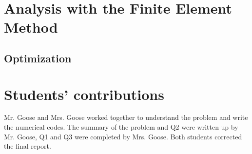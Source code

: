 \documentclass[12pt]{article}
\begin{document}
    



\section{Analysis with the Finite Element Method}


\subsection{Optimization}


\vfill

\section*{Students' contributions}
Mr. Goose and Mrs. Goose worked together to understand the problem and write the numerical codes. The summary of the problem and Q2 were written up by Mr. Goose, Q1 and Q3 were completed by Mrs. Goose. Both students corrected the final report.

\newpage

\end{document}
